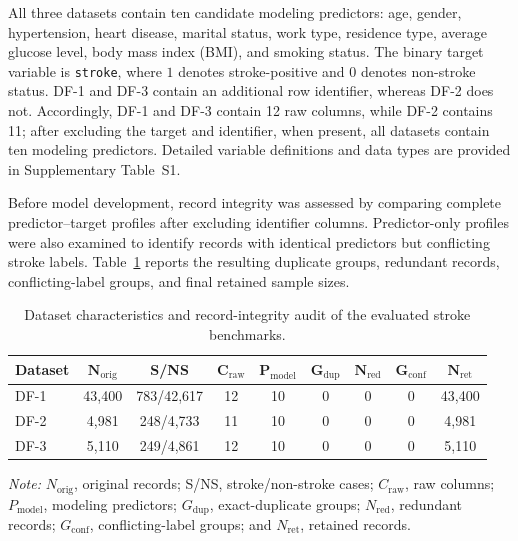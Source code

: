 \documentclass[pdflatex,sn-mathphys-num]{sn-jnl}%
\theoremstyle{thmstyleone}%
\theoremstyle{thmstyletwo}%
\theoremstyle{thmstylethree}%
\begin{document}
All three datasets contain ten candidate modeling predictors: age, gender,
hypertension, heart disease, marital status, work type, residence type,
average glucose level, body mass index (BMI), and smoking status. The binary
target variable is \texttt{stroke}, where \(1\) denotes stroke-positive and
\(0\) denotes non-stroke status. DF-1 and DF-3 contain an additional row
identifier, whereas DF-2 does not. Accordingly, DF-1 and DF-3 contain 12 raw
columns, while DF-2 contains 11; after excluding the target and identifier,
when present, all datasets contain ten modeling predictors. Detailed variable
definitions and data types are provided in Supplementary Table~S1.

 {
Before model development, record integrity was assessed by comparing complete
predictor--target profiles after excluding identifier columns. Predictor-only
profiles were also examined to identify records with identical predictors but
conflicting stroke labels. Table~\ref{tab:dataset_summary2} reports the
resulting duplicate groups, redundant records, conflicting-label groups, and
final retained sample sizes.
}

\begin{table}[!ht]
\centering
\caption{
Dataset characteristics and record-integrity audit of the evaluated stroke
benchmarks.
}
\label{tab:dataset_summary2}
\small
\setlength{\tabcolsep}{4.2pt}
\renewcommand{\arraystretch}{1.10}

\begin{tabular}{@{}lcccccccc@{}}
\toprule
\textbf{Dataset} &
\(\boldsymbol{N}_{\mathrm{orig}}\) &
\textbf{S/NS} &
\(\boldsymbol{C}_{\mathrm{raw}}\) &
\(\boldsymbol{P}_{\mathrm{model}}\) &
\(\boldsymbol{G}_{\mathrm{dup}}\) &
\(\boldsymbol{N}_{\mathrm{red}}\) &
\(\boldsymbol{G}_{\mathrm{conf}}\) &
\(\boldsymbol{N}_{\mathrm{ret}}\) \\
\midrule

DF-1~\cite{dataset_df1} &
43,400 &
783/42,617 &
12 &
10 &
0 &
0 &
0 &
43,400 \\

DF-2~\cite{dataset_df2} &
4,981 &
248/4,733 &
11 &
10 &
0 &
0 &
0 &
4,981 \\

DF-3~\cite{dataset_df3} &
5,110 &
249/4,861 &
12 &
10 &
0 &
0 &
0 &
5,110 \\

\bottomrule
\end{tabular}

\vspace{2pt}
\begin{minipage}{0.98\textwidth}
\footnotesize
\textit{Note:}
\(N_{\mathrm{orig}}\), original records;
S/NS, stroke/non-stroke cases;
\(C_{\mathrm{raw}}\), raw columns;
\(P_{\mathrm{model}}\), modeling predictors;
\(G_{\mathrm{dup}}\), exact-duplicate groups;
\(N_{\mathrm{red}}\), redundant records;
\(G_{\mathrm{conf}}\), conflicting-label groups; and
\(N_{\mathrm{ret}}\), retained records.
\end{minipage}
\end{table}
\end{document}
